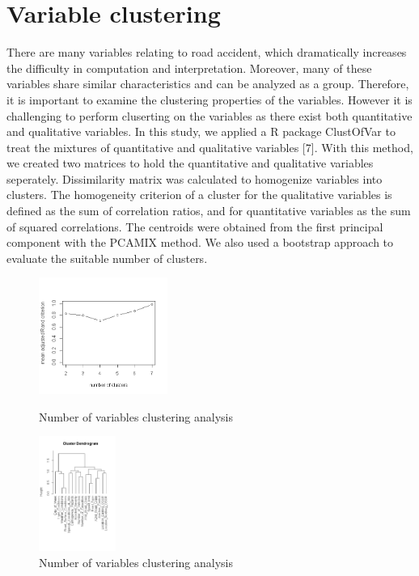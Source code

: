 \documentclass{neu_handout}
\begin{document}
\section{Variable clustering}
There are many variables relating to road accident, which dramatically increases the difficulty in computation and interpretation. Moreover, many of these variables share similar characteristics and can be analyzed as a group. Therefore, it is important to examine the clustering properties of the variables. However it is challenging to perform cluserting on the variables as there exist both quantitative and qualitative variables. In this study, we applied a R package ClustOfVar to treat the mixtures of quantitative and qualitative variables [7]. With this method, we created two matrices to hold the quantitative and qualitative variables seperately. Dissimilarity matrix was calculated to homogenize variables into clusters. The homogeneity criterion of a cluster for the qualitative variables is defined as the sum of correlation ratios, and for quantitative variables as the sum of squared correlations. The centroids were obtained from the first principal component with the PCAMIX method. We also used a bootstrap approach to evaluate the suitable number of clusters.

\begin{figure}[!htb]
  \includegraphics[height=3.80cm, width=.9\linewidth]{Hierarchical cluster numbers evaluation.png}
  \caption{Number of variables clustering analysis}\label{fig:hclust_number}
\endminipage\hfill
{}
  \includegraphics[height=3.75cm, width=\linewidth]{Dendrogram of variable cluster.png}
  \caption{Number of variables clustering analysis}\label{fig:hclust}
\endminipage
\end{figure}
\end{document}
